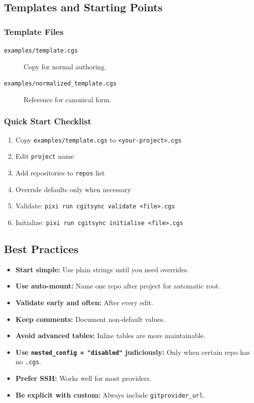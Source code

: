 \subsection{Templates and Starting Points}
\label{subsec:cgs-templates}

\subsubsection{Template Files}

\begin{description}
  \item[\texttt{examples/template.cgs}] Copy for normal authoring.
  \item[\texttt{examples/normalized\_template.cgs}] Reference for canonical form.
\end{description}

\subsubsection{Quick Start Checklist}

\begin{enumerate}
  \item Copy \texttt{examples/template.cgs} to \texttt{<your-project>.cgs}
  \item Edit \texttt{project} name
  \item Add repositories to \texttt{repos} list
  \item Override defaults only when necessary
  \item Validate: \texttt{pixi run cgitsync validate <file>.cgs}
  \item Initialize: \texttt{pixi run cgitsync initialise <file>.cgs}
\end{enumerate}

\subsection{Best Practices}
\label{subsec:cgs-best-practices}

\begin{itemize}
  \item \textbf{Start simple:} Use plain strings until you need overrides.
  \item \textbf{Use auto-mount:} Name one repo after project for automatic root.
  \item \textbf{Validate early and often:} After every edit.
  \item \textbf{Keep comments:} Document non-default values.
  \item \textbf{Avoid advanced tables:} Inline tables are more maintainable.
  \item \textbf{Use \texttt{nested\_config = "disabled"} judiciously:}
        Only when certain repo has no \texttt{.cgs}.
  \item \textbf{Prefer SSH:} Works well for most providers.
  \item \textbf{Be explicit with custom:} Always include \texttt{gitprovider\_url}.
\end{itemize}

